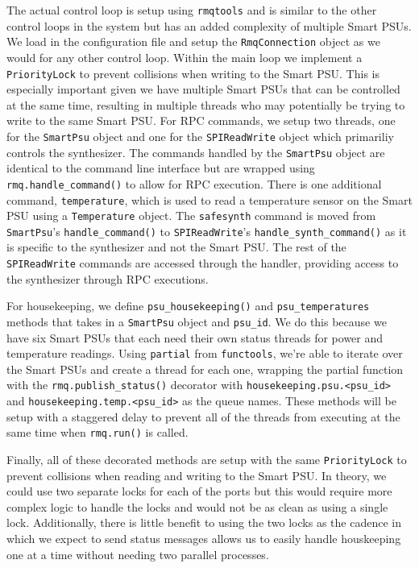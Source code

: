 The actual control loop is setup using \texttt{rmqtools} and is similar to the other control loops in the system but has an added complexity of multiple Smart PSUs. 
We load in the configuration file and setup the \texttt{RmqConnection} object as we would for any other control loop.
Within the main loop we implement a \texttt{PriorityLock} to prevent collisions when writing to the Smart PSU.
This is especially important given we have multiple Smart PSUs that can be controlled at the same time, resulting in multiple threads who may potentially be trying to write to the same Smart PSU.
For RPC commands, we setup two threads, one for the \texttt{SmartPsu} object and one for the \texttt{SPIReadWrite} object which primariliy controls the synthesizer.
The commands handled by the \texttt{SmartPsu} object are identical to the command line interface but are wrapped using \texttt{rmq.handle\_command()} to allow for RPC execution.
There is one additional command, \texttt{temperature}, which is used to read a temperature sensor on the Smart PSU using a \texttt{Temperature} object.
The \texttt{safesynth} command is moved from  \texttt{SmartPsu}'s \texttt{handle\_command()} to \texttt{SPIReadWrite}'s \texttt{handle\_synth\_command()} as it is specific to the synthesizer and not the Smart PSU.
The rest of the \texttt{SPIReadWrite} commands are accessed through the handler, providing access to the synthesizer through RPC executions.

For housekeeping, we define \texttt{psu\_housekeeping()} and \texttt{psu\_temperatures} methods that takes in a \texttt{SmartPsu} object and \texttt{psu\_id}.
We do this because we have six Smart PSUs that each need their own status threads for power and temperature readings. 
Using \texttt{partial} from \texttt{functools}, we're able to iterate over the Smart PSUs and create a thread for each one, wrapping the partial function with the \texttt{rmq.publish\_status()} decorator with \texttt{housekeeping.psu.<psu\_id>} and \texttt{housekeeping.temp.<psu\_id>} as the queue names.
These methods will be setup with a staggered delay to prevent all of the threads from executing at the same time when \texttt{rmq.run()} is called. 

Finally, all of these decorated methods are setup with the same \texttt{PriorityLock} to prevent collisions when reading and writing to the Smart PSU.
In theory, we could use two separate locks for each of the ports but this would require more complex logic to handle the locks and would not be as clean as using a single lock.
Additionally, there is little benefit to using the two locks as the cadence in which we expect to send status messages allows us to easily handle houskeeping one at a time without needing two parallel processes. 

